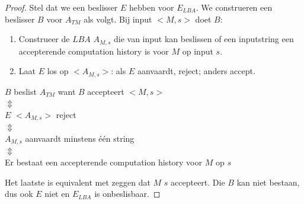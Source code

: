 \begin{proof}
	Stel dat we een beslisser $E$ hebben voor $E_{LBA}$. We construeren een beslisser $B$ voor $A_{TM}$ als volgt. Bij input $<M,s>$ doet $B$:
	\begin{enumerate}
		\item Construeer de $LBA$ $A_{M,s}$ die van input kan beslissen of een inputstring een accepterende computation history is voor $M$ op input $s$.
		\item Laat $E$ los op $<A_{M,s}>$: als $E$ aanvaardt, reject; anders accept.
	\end{enumerate}
	\begin{center}
		$B$ beslist $A_{TM}$ want $B$ accepteert $<M,s>$\\
		$\Updownarrow$\\
		$E$ $<A_{M,s}>$ reject\\
		$\Updownarrow$\\
		$A_{M,s}$ aanvaardt minstens \'e\'en string\\
		$\Updownarrow$\\
		Er bestaat een accepterende computation history voor $M$ op $s$
	\end{center}
	Het laatste is equivalent met zeggen dat $M$ $s$ accepteert.
	Die $B$ kan niet bestaan, dus ook $E$ niet en $E_{LBA}$ is onbeslisbaar.
\end{proof}
